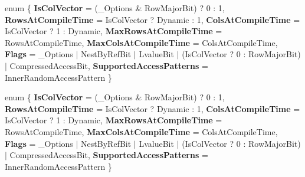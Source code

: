\begin{DoxyCompactItemize}
\item 
\mbox{\label{struct_eigen_1_1internal_1_1traits_3_01_sparse_vector_3_01___scalar_00_01___options_00_01___storage_index_01_4_01_4_a62ccd18adf9da12b4f362e34844acd59}} 
enum \{ \newline
{\bfseries Is\+Col\+Vector} = (\+\_\+\+Options \& Row\+Major\+Bit) ? 0 \+: 1, 
{\bfseries Rows\+At\+Compile\+Time} = Is\+Col\+Vector ? Dynamic \+: 1, 
{\bfseries Cols\+At\+Compile\+Time} = Is\+Col\+Vector ? 1 \+: Dynamic, 
{\bfseries Max\+Rows\+At\+Compile\+Time} = Rows\+At\+Compile\+Time, 
\newline
{\bfseries Max\+Cols\+At\+Compile\+Time} = Cols\+At\+Compile\+Time, 
{\bfseries Flags} = \+\_\+\+Options $\vert$ Nest\+By\+Ref\+Bit $\vert$ Lvalue\+Bit $\vert$ (Is\+Col\+Vector ? 0 \+: Row\+Major\+Bit) $\vert$ Compressed\+Access\+Bit, 
{\bfseries Supported\+Access\+Patterns} = Inner\+Random\+Access\+Pattern
 \}
\item 
\mbox{\label{struct_eigen_1_1internal_1_1traits_3_01_sparse_vector_3_01___scalar_00_01___options_00_01___storage_index_01_4_01_4_a5892b1973ee7820de3371142e77d7f57}} 
enum \{ \newline
{\bfseries Is\+Col\+Vector} = (\+\_\+\+Options \& Row\+Major\+Bit) ? 0 \+: 1, 
{\bfseries Rows\+At\+Compile\+Time} = Is\+Col\+Vector ? Dynamic \+: 1, 
{\bfseries Cols\+At\+Compile\+Time} = Is\+Col\+Vector ? 1 \+: Dynamic, 
{\bfseries Max\+Rows\+At\+Compile\+Time} = Rows\+At\+Compile\+Time, 
\newline
{\bfseries Max\+Cols\+At\+Compile\+Time} = Cols\+At\+Compile\+Time, 
{\bfseries Flags} = \+\_\+\+Options $\vert$ Nest\+By\+Ref\+Bit $\vert$ Lvalue\+Bit $\vert$ (Is\+Col\+Vector ? 0 \+: Row\+Major\+Bit) $\vert$ Compressed\+Access\+Bit, 
{\bfseries Supported\+Access\+Patterns} = Inner\+Random\+Access\+Pattern
 \}
\item 
\mbox{\label{struct_eigen_1_1internal_1_1traits_3_01_sparse_vector_3_01___scalar_00_01___options_00_01___storage_index_01_4_01_4_a82769d78cf75ea2316a85d621bedbff3}} 

\end{DoxyCompactItemize}
